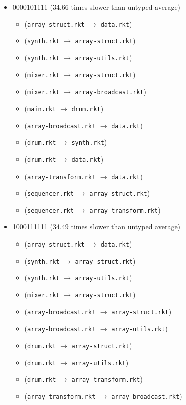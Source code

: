 \documentclass{article}
\newcommand{\mono}[1]{\texttt{#1}}
\begin{document}
\begin{itemize}
\item 0000101111 (34.66 times slower than untyped average)
  \begin{itemize}
  \item (\mono{array-struct.rkt} $\rightarrow$ \mono{data.rkt})
  \item (\mono{synth.rkt} $\rightarrow$ \mono{array-struct.rkt})
  \item (\mono{synth.rkt} $\rightarrow$ \mono{array-utils.rkt})
  \item (\mono{mixer.rkt} $\rightarrow$ \mono{array-struct.rkt})
  \item (\mono{mixer.rkt} $\rightarrow$ \mono{array-broadcast.rkt})
  \item (\mono{main.rkt} $\rightarrow$ \mono{drum.rkt})
  \item (\mono{array-broadcast.rkt} $\rightarrow$ \mono{data.rkt})
  \item (\mono{drum.rkt} $\rightarrow$ \mono{synth.rkt})
  \item (\mono{drum.rkt} $\rightarrow$ \mono{data.rkt})
  \item (\mono{array-transform.rkt} $\rightarrow$ \mono{data.rkt})
  \item (\mono{sequencer.rkt} $\rightarrow$ \mono{array-struct.rkt})
  \item (\mono{sequencer.rkt} $\rightarrow$ \mono{array-transform.rkt})
  \end{itemize}
\item 1000111111 (34.49 times slower than untyped average)
  \begin{itemize}
  \item (\mono{array-struct.rkt} $\rightarrow$ \mono{data.rkt})
  \item (\mono{synth.rkt} $\rightarrow$ \mono{array-struct.rkt})
  \item (\mono{synth.rkt} $\rightarrow$ \mono{array-utils.rkt})
  \item (\mono{mixer.rkt} $\rightarrow$ \mono{array-struct.rkt})
  \item (\mono{array-broadcast.rkt} $\rightarrow$ \mono{array-struct.rkt})
  \item (\mono{array-broadcast.rkt} $\rightarrow$ \mono{array-utils.rkt})
  \item (\mono{drum.rkt} $\rightarrow$ \mono{array-struct.rkt})
  \item (\mono{drum.rkt} $\rightarrow$ \mono{array-utils.rkt})
  \item (\mono{drum.rkt} $\rightarrow$ \mono{array-transform.rkt})
  \item (\mono{array-transform.rkt} $\rightarrow$ \mono{array-broadcast.rkt})

\end{itemize}
\end{itemize}
\end{document}
